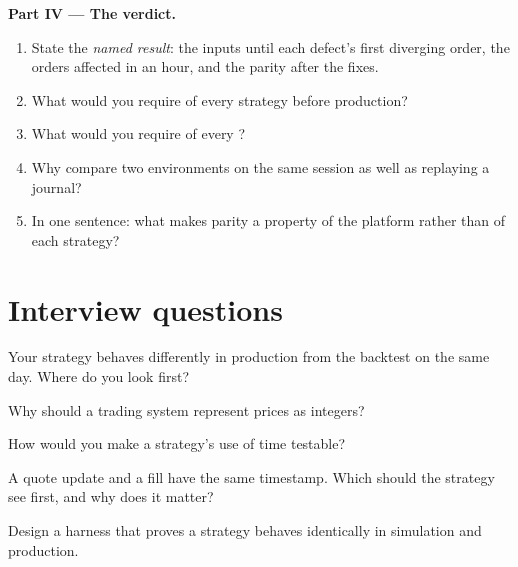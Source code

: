 \begin{problem}
\medskip\noindent\textbf{Part IV --- The verdict.}
\begin{enumerate}[resume]
\item State the \emph{named result}: the inputs until each defect's first diverging order, the orders affected in an hour, and the
parity after the fixes.
\item What would you require of every strategy before production?
\item What would you require of every ?
\item Why compare two environments on the same session as well as replaying a journal?
\item In one sentence: what makes parity a property of the platform rather than of each strategy?
\end{enumerate}
\end{problem}

\section{Interview questions}

\begin{interviewq}\label{iq:pl:simulation-production-parity:1}
Your strategy behaves differently in production from the backtest on the same day. Where do you look first?
\end{interviewq}

\begin{interviewq}\label{iq:pl:simulation-production-parity:2}
Why should a trading system represent prices as integers?
\end{interviewq}

\begin{interviewq}\label{iq:pl:simulation-production-parity:3}
How would you make a strategy's use of time testable?
\end{interviewq}

\begin{interviewq}\label{iq:pl:simulation-production-parity:4}
A quote update and a fill have the same timestamp. Which should the strategy see first, and why does it matter?
\end{interviewq}

\begin{interviewq}\label{iq:pl:simulation-production-parity:5}
Design a harness that proves a strategy behaves identically in simulation and production.
\end{interviewq}
